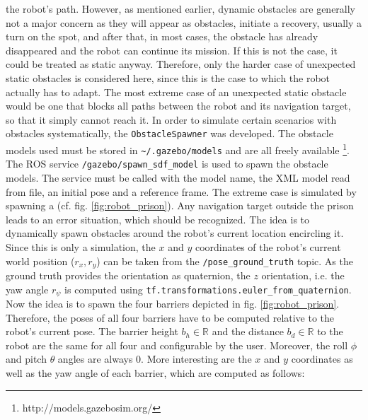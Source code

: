 \documentclass[english, master, utf8]{base/thesis_KBS}
\newcommand{\code}[1]{\colorbox{light-gray}{\texttt{#1}}}
\begin{document}
the robot's path. However, as mentioned earlier, dynamic obstacles are generally not a major concern as they will appear as obstacles, initiate a recovery, usually a turn on the
spot, and after that, in most cases, the obstacle has already disappeared and the robot can continue its mission. If this is not the case, it could be treated as static anyway.
Therefore, only the harder case of unexpected static obstacles is considered here, since this is the case to which the robot actually has to adapt. The most extreme case of an
unexpected static obstacle would be one that blocks all paths between the robot and its navigation target, so that it simply cannot reach it. In order to simulate certain scenarios
with obstacles systematically, the \code{ObstacleSpawner} was developed. The obstacle models used must be stored in \code{\textasciitilde/.gazebo/models} and are all freely available
\footnote{http://models.gazebosim.org/}. The ROS service \code{/gazebo/spawn\_sdf\_model} is used to spawn the obstacle models. The service must be called with the model name,
the XML model read from file, an initial pose and a reference frame. The extreme case is simulated by spawning a  (cf. fig. \ref{fig:robot_prison}). Any
navigation target outside the prison leads to an error situation, which should be recognized. The idea is to dynamically spawn obstacles around the robot's current location encircling
it. Since this is only a simulation, the $x$ and $y$ coordinates of the robot's current world position ($r_x, r_y$) can be taken from the \code{/pose\_ground\_truth} topic.
As the ground truth provides the orientation as quaternion, the $z$ orientation, i.e. the yaw angle $r_\psi$ is computed using \code{tf.transformations.euler\_from\_quaternion}.
Now the idea is to spawn the four barriers depicted in fig. \ref{fig:robot_prison}. Therefore, the poses of all four barriers have to be computed relative to the robot's current
pose. The barrier height $b_h \in \mathbb{R}$ and the distance $b_d \in \mathbb{R}$ to the robot are the same for all four and configurable by the user. Moreover, the roll $\phi$
and pitch $\theta$ angles are always $0$. More interesting are the $x$ and $y$ coordinates as well as the yaw angle of each barrier, which are computed as follows:
\end{document}

